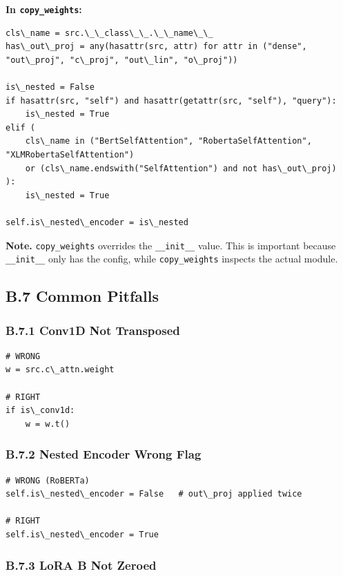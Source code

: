 \textbf{In \texttt{copy\_weights}:}

\begin{lstlisting}
cls\_name = src.\_\_class\_\_.\_\_name\_\_
has\_out\_proj = any(hasattr(src, attr) for attr in ("dense", "out\_proj", "c\_proj", "out\_lin", "o\_proj"))

is\_nested = False
if hasattr(src, "self") and hasattr(getattr(src, "self"), "query"):
    is\_nested = True
elif (
    cls\_name in ("BertSelfAttention", "RobertaSelfAttention", "XLMRobertaSelfAttention")
    or (cls\_name.endswith("SelfAttention") and not has\_out\_proj)
):
    is\_nested = True

self.is\_nested\_encoder = is\_nested
\end{lstlisting}

\textbf{Note.} \texttt{copy\_weights} overrides the \texttt{\_\_init\_\_} value. This is important 
because \texttt{\_\_init\_\_} only has the config, while \texttt{copy\_weights} inspects the 
actual module.

\subsection{B.7 Common Pitfalls}

\subsubsection{B.7.1 Conv1D Not Transposed}

\begin{lstlisting}
# WRONG
w = src.c\_attn.weight

# RIGHT
if is\_conv1d:
    w = w.t()
\end{lstlisting}

\subsubsection{B.7.2 Nested Encoder Wrong Flag}

\begin{lstlisting}
# WRONG (RoBERTa)
self.is\_nested\_encoder = False   # out\_proj applied twice

# RIGHT
self.is\_nested\_encoder = True
\end{lstlisting}

\subsubsection{B.7.3 LoRA B Not Zeroed}

